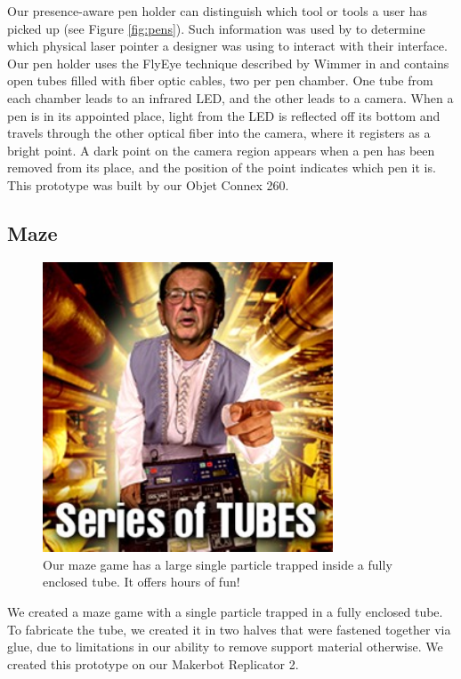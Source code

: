 Our presence-aware pen holder can distinguish which tool or tools a user has picked up (see Figure \ref{fig:pens}).  Such information was used by \cite{Mueller-constructable} to determine which physical laser pointer a designer was using to interact with their interface.  Our pen holder uses the FlyEye technique described by Wimmer in \cite{Wimmer-flyeye} and contains open tubes filled with fiber optic cables, two per pen chamber.  One tube from each chamber leads to an infrared LED, and the other leads to a camera.  When a pen is in its appointed place, light from the LED is reflected off its bottom and travels through the other optical fiber into the camera, where it registers as a bright point.  A dark point on the camera region appears when a pen has been removed from its place, and the position of the point indicates which pen it is.  This prototype was built by our Objet Connex 260.

\subsection{Maze}

\begin{figure}[h]
\centering
    \includegraphics[width=3.4in]{figures/series-of-tubes.jpg}
\caption{Our maze game has a large single particle trapped inside a fully enclosed tube.  It offers hours of fun!}
\label{fig:maze}
\end{figure}

We created a maze game with a single particle trapped in a fully enclosed tube.  To fabricate the tube, we created it in two halves that were fastened together via glue, due to limitations in our ability to remove support material otherwise.  We created this prototype on our Makerbot Replicator 2.

